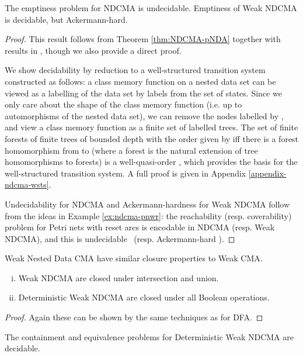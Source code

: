\begin{theorem}\label{thm:ndcma-emptiness}
The emptiness problem for NDCMA is undecidable.  Emptiness of Weak NDCMA is decidable, but Ackermann-hard.
\end{theorem}
\begin{proof}
This result follows from Theorem \ref{thm:NDCMA-pNDA} together with results in \cite{Decker14}, though we also provide a direct proof.

We show decidability by reduction to a well-structured transition system \cite{FinkelS01} constructed as follows: a class memory function on a nested data set can be viewed as a labelling of the data set by labels from the set of states.  Since we only care about the shape of the class memory function (i.e. up to automorphisms of the nested data set), we can remove the nodes labelled by , and view a class memory function as a finite set of labelled trees.  The set of finite forests of finite trees of bounded depth with the order given by  iff there is a forest homomorphism from  to  (where a forest is the natural extension of tree homomorphisms to forests) is a well-quasi-order \cite{Meyer08}, which provides the basis for the well-structured transition system.  A full proof is given in Appendix \ref{appendix-ndcma-wsts}.

Undecidability for NDCMA and Ackermann-hardness for Weak NDCMA follow from the ideas in Example \ref{ex:ndcma-pnwr}: the reachability (resp. coverability) problem for Petri nets with reset arcs is encodable in NDCMA (resp. Weak NDCMA), and this is undecidable~\cite{ArakiK76} (resp. Ackermann-hard \cite{Schnoebelen02}).
\end{proof}
Weak Nested Data CMA have similar closure properties to Weak CMA.
\begin{proposition}
\begin{enumerate}[(i)]
\item Weak NDCMA are closed under intersection and union.
\item Deterministic Weak NDCMA are closed under all Boolean operations.
\end{enumerate}
\end{proposition}
\begin{proof}
Again these can be shown by the same techniques as for DFA.
\end{proof}

\begin{corollary}
The containment and equivalence problems for
Deterministic Weak NDCMA are decidable.
\end{corollary}

